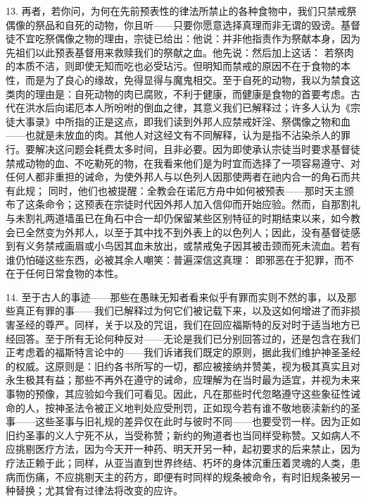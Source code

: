 13. 再者，若你问，为何在先前预表性的律法所禁止的各种食物中，我们只禁戒祭偶像的祭品和自死的动物，你且听——只要你愿意选择真理而非无谓的毁谤。基督徒不宜吃祭偶像之物的理由，宗徒已给出：他说：并非他指责作为祭献本身，因为先祖们以此预表基督用来救赎我们的祭献之血。他先说：然后加上这话： 若祭肉的本质不洁，则即使无知而吃也必受玷污。但明知而禁戒的原因不在于食物的本性，而是为了良心的缘故，免得显得与魔鬼相交。至于自死的动物，我以为禁食这类肉的理由是：自死动物的肉已腐败，不利于健康，而健康是食物的首要考虑。古代在洪水后向诺厄本人所吩咐的倒血之律，其意义我们已解释过；许多人认为《宗徒大事录》中所指的正是这点，即我们读到外邦人应禁戒奸淫、祭偶像之物和血——也就是未放血的肉。其他人对这经文有不同解释，认为是指不沾染杀人的罪行。要解决这问题会耗费太多时间，且非必要。因为即使承认宗徒当时要求基督徒禁戒动物的血、不吃勒死的物，在我看来他们是为时宜而选择了一项容易遵守、对任何人都非重担的诫命，为使外邦人与以色列人因那使两者在祂内合一的角石而共有此规； 同时，他们也被提醒：全教会在诺厄方舟中如何被预表——那时天主颁布了这条命令；这预表在宗徒时代因外邦人加入信仰而开始应验。然而，自那割礼与未割礼两道墙虽已在角石中合一却仍保留某些区别特征的时期结束以来，如今教会已全然变为外邦人，以至于其中找不到外表上的以色列人；因此，没有基督徒感到有义务禁戒画眉或小鸟因其血未放出，或禁戒兔子因其被击颈而死未流血。若有谁仍怕碰这些东西，必被其余人嘲笑：普遍深信这真理： 即邪恶在于犯罪，而不在于任何日常食物的本性。\par

14. 至于古人的事迹——那些在愚昧无知者看来似乎有罪而实则不然的事，以及那些真正有罪的事——我们已解释过为何它们被记载下来，以及这如何增进了而非损害圣经的尊严。同样，关于以及的咒诅，我们在回应福斯特的反对时于适当地方已经回答。至于所有无论何种反对——无论是我们已分别回答过的，还是包含在我们正考虑着的福斯特言论中的——我们诉诸我们既定的原则，据此我们维护神圣圣经的权威。这原则是：旧约各书所写的一切，都应被接纳并赞美，视为极其真实且对永生极其有益；那些不再外在遵守的诫命，应理解为在当时最为适宜，并视为未来事物的预像，其应验如今我们可看见。因此，凡在那些时代忽略遵守这些象征性诫命的人，按神圣法令被正义地判处应受刑罚，正如现今若有谁不敬地亵渎新约的圣事——这些圣事与旧礼规的差异仅在此时与彼时不同——也要受罚一样。因为正如旧约圣事的义人宁死不从，当受称赞；新约的殉道者也当同样受称赞。又如病人不应挑剔医疗方法，因为今天开一种药、明天开另一种，起初要求的后来禁止，因为疗法正赖于此；同样，从亚当直到世界终结、朽坏的身体沉重压着灵魂的人类，患病而伤痛，不应挑剔天主的药方，即便有时同样的规条被命令，有时旧规条被另一种替换；尤其曾有过律法将改变的应许。\par

